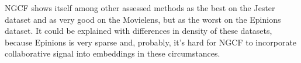 


NGCF shows itself among other assessed methods as the best on the Jester dataset 
and as very good on the Movielens, but as the worst on the Epinions dataset.
It could be explained with differences in density of these datasets, because
Epinions is very sparse and, probably, it's hard for NGCF to incorporate 
collaborative signal into embeddings in these circumstances.



